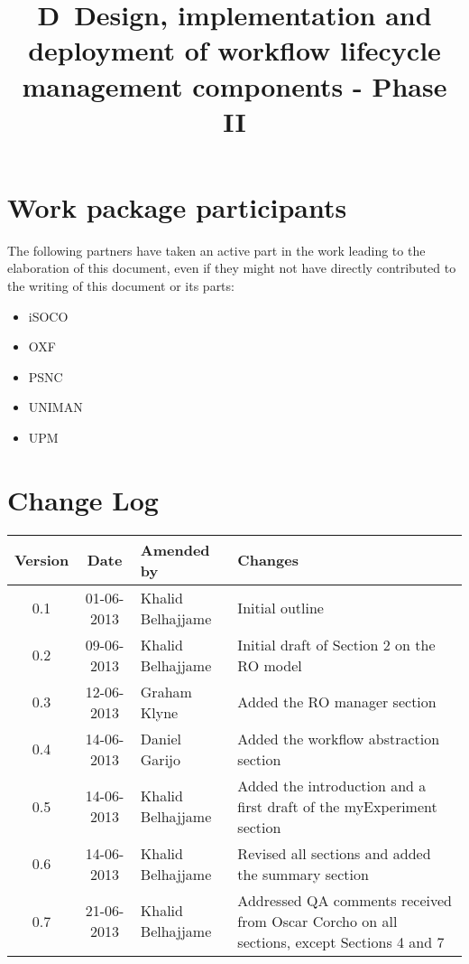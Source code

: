 \documentclass[a4paper, twoside, 11pt]{article}
\title{D\delid\ Design, implementation and deployment of workflow
  lifecycle management components - Phase II}
\begin{document}
\maketitle


\section*{Work package participants} The following partners have taken an active part in the work leading to the elaboration of this document, even if they might not have directly contributed to the writing of this document or its parts: %
\begin{itemize}
\item iSOCO
\item OXF
\item PSNC
\item UNIMAN
\item UPM
\end{itemize}

\section*{Change Log}
\begin{centering}

\begin{tabular}{|c|c|p{4.92cm}|p{6.5cm}|}

\hline \textbf{Version} & \textbf{Date} & \textbf{Amended by} & \textbf{Changes} \\ \hline
0.1 & 01-06-2013 & Khalid Belhajjame & Initial outline \\ \hline
0.2 & 09-06-2013 & Khalid Belhajjame & Initial draft of Section 2 on the RO model \\ \hline
0.3 & 12-06-2013 & Graham Klyne & Added the RO manager section \\ \hline
0.4 & 14-06-2013 & Daniel Garijo & Added the workflow abstraction section \\ \hline
0.5 & 14-06-2013 & Khalid Belhajjame & Added the introduction and a first draft of the myExperiment section \\ \hline
0.6 & 14-06-2013 & Khalid Belhajjame & Revised all sections and added the summary section \\ \hline
0.7 & 21-06-2013 & Khalid Belhajjame & Addressed QA comments received from Oscar Corcho on all sections, except Sections 4 and 7 \\ \hline

\end{tabular}

\end{centering}
\clearpage
\end{document}
